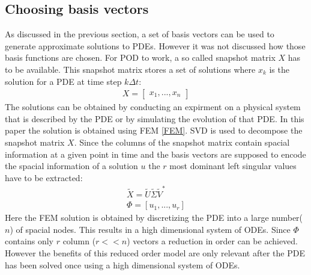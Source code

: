 \subsection{Choosing basis vectors}
As discussed in the previous section, a set of basis vectors can be used to generate approximate solutions to PDEs.
However it was not discussed how those basis functions are chosen.
For POD to work, a so called snapshot matrix \(X\) has to be available.
This snapshot matrix stores a set of solutions where \(x_k\) is the solution for a PDE at time step \(k\Delta t\):
\begin{gather}
X = \begin{bmatrix}
x_1, ..., x_n
\end{bmatrix}
\end{gather}
The solutions can be obtained by conducting an expirment on a physical system that is described by the PDE or by simulating the evolution of that PDE.
In this paper the solution is obtained using FEM \ref{FEM}.
SVD is used to decompose the snapshot matrix \(X\).
Since the columns of the snapshot matrix contain spacial information at a given point in time and the basis vectors are supposed to encode the spacial information of a solution \(u\) the \(r\) most dominant left singular values have to be extracted:
\begin{gather}
\tilde{X} = \tilde{U}\tilde{\Sigma}\tilde{V}^{*} \\
\Phi = [u_1, ..., u_r]
\end{gather}
Here the FEM solution is obtained by discretizing the PDE into a large number(\(n\)) of spacial nodes.
This results in a high dimensional system of ODEs.
Since \(\Phi\) contains only \(r\) column (\(r << n\)) vectors a reduction in order can be achieved.
However the benefits of this reduced order model are only relevant after the PDE has been solved once using a high dimensional system of ODEs.
